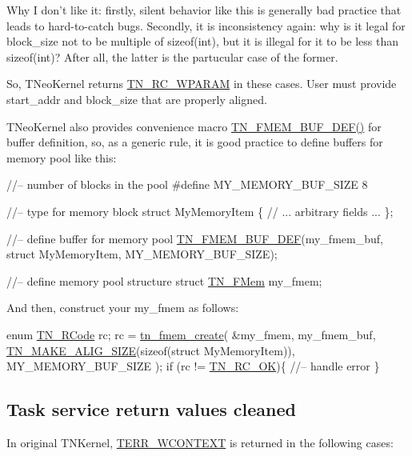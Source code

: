 Why I don't like it\+: firstly, silent behavior like this is generally bad practice that leads to hard-\/to-\/catch bugs. Secondly, it is inconsistency again\+: why is it legal for {\ttfamily block\+\_\+size} not to be multiple of {\ttfamily sizeof(int)}, but it is illegal for it to be less than {\ttfamily sizeof(int)}? After all, the latter is the partucular case of the former.

So, T\+Neo\+Kernel returns {\ttfamily \hyperlink{tn__common_8h_aa43bd3da1ad4c1e61224b5f23b369876a89909a6426b477a38496a1be67590e68}{T\+N\+\_\+\+R\+C\+\_\+\+W\+P\+A\+R\+A\+M}} in these cases. User must provide {\ttfamily start\+\_\+addr} and {\ttfamily block\+\_\+size} that are properly aligned.

T\+Neo\+Kernel also provides convenience macro {\ttfamily \hyperlink{tn__fmem_8h_ab45e9c2ad4a64345214f9a912bf76fc3}{T\+N\+\_\+\+F\+M\+E\+M\+\_\+\+B\+U\+F\+\_\+\+D\+E\+F()}} for buffer definition, so, as a generic rule, it is good practice to define buffers for memory pool like this\+:


\begin{DoxyCode}
\textcolor{comment}{//-- number of blocks in the pool}
\textcolor{preprocessor}{#define MY\_MEMORY\_BUF\_SIZE    8}

\textcolor{comment}{//-- type for memory block}
\textcolor{keyword}{struct }MyMemoryItem \{
   \textcolor{comment}{// ... arbitrary fields ...}
\};

\textcolor{comment}{//-- define buffer for memory pool}
\hyperlink{tn__fmem_8h_ab45e9c2ad4a64345214f9a912bf76fc3}{TN\_FMEM\_BUF\_DEF}(my\_fmem\_buf, \textcolor{keyword}{struct} MyMemoryItem, MY\_MEMORY\_BUF\_SIZE);

\textcolor{comment}{//-- define memory pool structure}
\textcolor{keyword}{struct }\hyperlink{structTN__FMem}{TN\_FMem} my\_fmem;
\end{DoxyCode}


And then, construct your {\ttfamily my\+\_\+fmem} as follows\+:


\begin{DoxyCode}
\textcolor{keyword}{enum} \hyperlink{tn__common_8h_aa43bd3da1ad4c1e61224b5f23b369876}{TN\_RCode} rc;
rc = \hyperlink{tn__fmem_8h_a56d47d4a1b6453d959336448a0ce96ac}{tn\_fmem\_create}( &my\_fmem,
                     my\_fmem\_buf,
                     \hyperlink{tn__common_8h_a3f48380e8a624edc643319a81192d88e}{TN\_MAKE\_ALIG\_SIZE}(\textcolor{keyword}{sizeof}(\textcolor{keyword}{struct} MyMemoryItem)),
                     MY\_MEMORY\_BUF\_SIZE );
\textcolor{keywordflow}{if} (rc != \hyperlink{tn__common_8h_aa43bd3da1ad4c1e61224b5f23b369876afb291924237186f5765865256c75e639}{TN\_RC\_OK})\{
   \textcolor{comment}{//-- handle error}
\}
\end{DoxyCode}
\hypertarget{tnkernel_diff_tnkernel_diff_task_retval}{}\subsection{Task service return values cleaned}\label{tnkernel_diff_tnkernel_diff_task_retval}
In original T\+N\+Kernel, {\ttfamily \hyperlink{tn__oldsymbols_8h_ad591ae7c53bbb81247492ea1d34a70b6}{T\+E\+R\+R\+\_\+\+W\+C\+O\+N\+T\+E\+X\+T}} is returned in the following cases\+:


